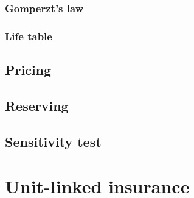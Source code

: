 \documentclass{report}
\begin{document}
\subsection{Gomperzt's law}
\subsection{Life table}

\subsection{}

\section{Pricing}

\section{Reserving}


\section{Sensitivity test}



























\chapter{Unit-linked insurance}     \label{unit-linked}



\end{document}

